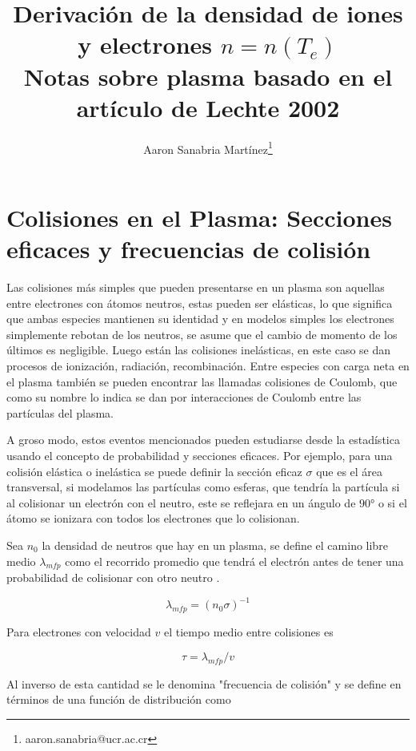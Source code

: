 \documentclass[11pt]{article}
\title{Derivaci\'on de la densidad de iones y electrones $n = n(T_e)$ \\ \small{Notas sobre plasma basado en el art\'iculo de Lechte 2002} \cite{lechte2002}}
\author{Aaron Sanabria Mart\'inez\footnote{aaron.sanabria@ucr.ac.cr}}
\theoremstyle{definition}
\begin{document}
  \maketitle
	\thispagestyle{empty}

  \section{Colisiones en el Plasma: Secciones eficaces y frecuencias de colisi\'on}

  Las colisiones m\'as simples que pueden presentarse en un plasma son aquellas entre electrones con \'atomos neutros, estas pueden ser el\'asticas, lo que significa que ambas especies mantienen su identidad y en modelos simples los electrones simplemente rebotan de los neutros, se asume que el cambio de momento de los \'ultimos es negligible. Luego est\'an las colisiones inel\'asticas, en este caso se dan procesos de ionizaci\'on, radiaci\'on, recombinaci\'on. Entre especies con carga neta en el plasma tambi\'en se pueden encontrar las llamadas colisiones de Coulomb, que como su nombre lo indica se dan por interacciones de Coulomb entre las part\'iculas del plasma. 

  A groso modo, estos eventos mencionados pueden estudiarse desde la estad\'istica usando el concepto de probabilidad y secciones eficaces. Por ejemplo, para una colisi\'on el\'astica o inel\'astica se puede definir la secci\'on eficaz $\sigma$ que es el \'area transversal, si modelamos las part\'iculas como esferas, que tendr\'ia la part\'icula si al colisionar un electr\'on con el neutro, este se reflejara en un \'angulo de $90°$ o si el \'atomo se ionizara con todos los electrones que lo colisionan.

  Sea $n_0$ la densidad de neutros que hay en un plasma, se define el camino libre medio $\lambda_{mfp}$ como el recorrido promedio que tendr\'a el electr\'on antes de tener una probabilidad de colisionar con otro neutro \cite{goldston1995}. 

  \begin{equation}\label{eq:mfp}
    \lambda_{mfp} = (n_0\sigma)^{-1}
  \end{equation}

  Para electrones con velocidad $v$ el tiempo medio entre colisiones es

  \begin{equation}\label{eq:tmc}
    \tau = \lambda_{mfp}/v
  \end{equation}

  Al inverso de esta cantidad se le denomina "frecuencia de colisi\'on" y se define en t\'erminos de una funci\'on de distribuci\'on como
  
\end{document}
